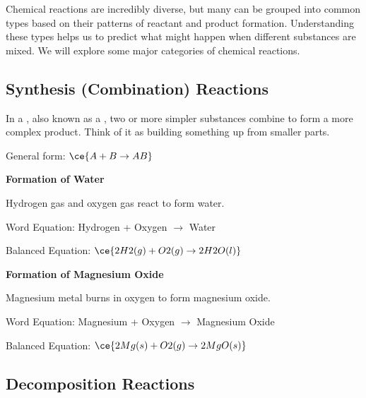 {

Chemical reactions are incredibly diverse, but many can be grouped into common types based on their patterns of reactant and product formation.  Understanding these types helps us to predict what might happen when different substances are mixed. We will explore some major categories of chemical reactions.

\subsection{Synthesis (Combination) Reactions}


In a , also known as a , two or more simpler substances combine to form a more complex product. Think of it as building something up from smaller parts.

General form: $\ce{A + B \rightarrow AB}$

\begin{example}
\textbf{Formation of Water}

Hydrogen gas and oxygen gas react to form water.

Word Equation: Hydrogen + Oxygen $\rightarrow$ Water

Balanced Equation: $\ce{2H2(g) + O2(g) \rightarrow 2H2O(l)}$
\end{example}

\begin{example}
\textbf{Formation of Magnesium Oxide}

Magnesium metal burns in oxygen to form magnesium oxide.

Word Equation: Magnesium + Oxygen $\rightarrow$ Magnesium Oxide

Balanced Equation: $\ce{2Mg(s) + O2(g) \rightarrow 2MgO(s)}$
\end{example}

\subsection{Decomposition Reactions}

}

